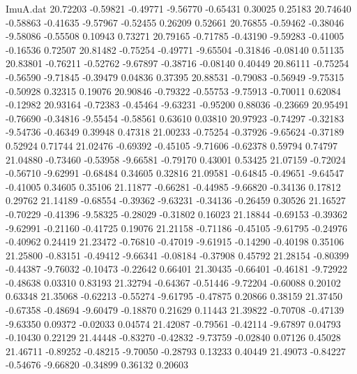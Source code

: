 \begin{filecontents}{ImuA.dat}
  20.72203   -0.59821   -0.49771   -9.56770   -0.65431    0.30025    0.25183
  20.74640   -0.58863   -0.41635   -9.57967   -0.52455    0.26209    0.52661
  20.76855   -0.59462   -0.38046   -9.58086   -0.55508    0.10943    0.73271
  20.79165   -0.71785   -0.43190   -9.59283   -0.41005   -0.16536    0.72507
  20.81482   -0.75254   -0.49771   -9.65504   -0.31846   -0.08140    0.51135
  20.83801   -0.76211   -0.52762   -9.67897   -0.38716   -0.08140    0.40449
  20.86111   -0.75254   -0.56590   -9.71845   -0.39479    0.04836    0.37395
  20.88531   -0.79083   -0.56949   -9.75315   -0.50928    0.32315    0.19076
  20.90846   -0.79322   -0.55753   -9.75913   -0.70011    0.62084   -0.12982
  20.93164   -0.72383   -0.45464   -9.63231   -0.95200    0.88036   -0.23669
  20.95491   -0.76690   -0.34816   -9.55454   -0.58561    0.63610    0.03810
  20.97923   -0.74297   -0.32183   -9.54736   -0.46349    0.39948    0.47318
  21.00233   -0.75254   -0.37926   -9.65624   -0.37189    0.52924    0.71744
  21.02476   -0.69392   -0.45105   -9.71606   -0.62378    0.59794    0.74797
  21.04880   -0.73460   -0.53958   -9.66581   -0.79170    0.43001    0.53425
  21.07159   -0.72024   -0.56710   -9.62991   -0.68484    0.34605    0.32816
  21.09581   -0.64845   -0.49651   -9.64547   -0.41005    0.34605    0.35106
  21.11877   -0.66281   -0.44985   -9.66820   -0.34136    0.17812    0.29762
  21.14189   -0.68554   -0.39362   -9.63231   -0.34136   -0.26459    0.30526
  21.16527   -0.70229   -0.41396   -9.58325   -0.28029   -0.31802    0.16023
  21.18844   -0.69153   -0.39362   -9.62991   -0.21160   -0.41725    0.19076
  21.21158   -0.71186   -0.45105   -9.61795   -0.24976   -0.40962    0.24419
  21.23472   -0.76810   -0.47019   -9.61915   -0.14290   -0.40198    0.35106
  21.25800   -0.83151   -0.49412   -9.66341   -0.08184   -0.37908    0.45792
  21.28154   -0.80399   -0.44387   -9.76032   -0.10473   -0.22642    0.66401
  21.30435   -0.66401   -0.46181   -9.72922   -0.48638    0.03310    0.83193
  21.32794   -0.64367   -0.51446   -9.72204   -0.60088    0.20102    0.63348
  21.35068   -0.62213   -0.55274   -9.61795   -0.47875    0.20866    0.38159
  21.37450   -0.67358   -0.48694   -9.60479   -0.18870    0.21629    0.11443
  21.39822   -0.70708   -0.47139   -9.63350    0.09372   -0.02033    0.04574
  21.42087   -0.79561   -0.42114   -9.67897    0.04793   -0.10430    0.22129
  21.44448   -0.83270   -0.42832   -9.73759   -0.02840    0.07126    0.45028
  21.46711   -0.89252   -0.48215   -9.70050   -0.28793    0.13233    0.40449
  21.49073   -0.84227   -0.54676   -9.66820   -0.34899    0.36132    0.20603

\end{filecontents}
